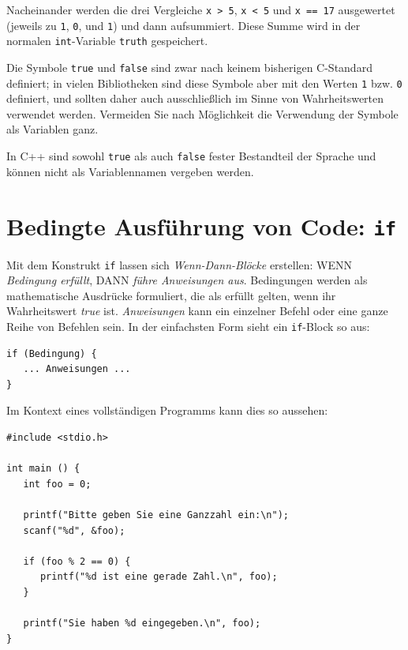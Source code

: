 Nacheinander werden die drei Vergleiche \texttt{x > 5}, \texttt{x < 5} und \texttt{x == 17} ausgewertet (jeweils zu \texttt{1}, \texttt{0}, und \texttt{1}) und dann aufsummiert. Diese Summe wird in der normalen \texttt{int}-Variable \texttt{truth} gespeichert.

\begin{warnbox}
Die Symbole \texttt{true} und \texttt{false} sind zwar nach keinem bisherigen C-Standard definiert; in vielen Bibliotheken sind diese Symbole aber mit den Werten \texttt{1} bzw. \texttt{0} definiert, und sollten daher auch ausschließlich im Sinne von Wahrheitswerten verwendet werden. Vermeiden Sie nach Möglichkeit die Verwendung der Symbole als Variablen ganz.

In C++ sind sowohl \texttt{true} als auch \texttt{false} fester Bestandteil der Sprache und können nicht als Variablennamen vergeben werden.
\end{warnbox}
\section{Bedingte Ausführung von Code: \texttt{if}}
Mit dem Konstrukt \texttt{if} lassen sich \emph{Wenn-Dann-Blöcke} erstellen: WENN \emph{Bedingung erfüllt}, DANN \emph{führe Anweisungen aus}. Bedingungen werden als mathematische Ausdrücke formuliert, die als erfüllt gelten, wenn ihr Wahrheitswert \emph{true} ist. \emph{Anweisungen} kann ein einzelner Befehl oder eine ganze Reihe von Befehlen sein. In der einfachsten Form sieht ein \texttt{if}-Block so aus:

\begin{codebox}
\begin{verbatim}
if (Bedingung) {
   ... Anweisungen ...
}
\end{verbatim}
\end{codebox}

Im Kontext eines vollständigen Programms kann dies so aussehen:

\begin{codebox}
\begin{verbatim}
#include <stdio.h>

int main () {
   int foo = 0;

   printf("Bitte geben Sie eine Ganzzahl ein:\n");
   scanf("%d", &foo);

   if (foo % 2 == 0) {
      printf("%d ist eine gerade Zahl.\n", foo);
   }

   printf("Sie haben %d eingegeben.\n", foo);
}
\end{verbatim}
\end{codebox}

